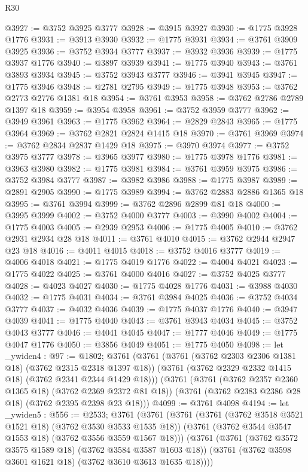 \begin{lexlean}{R30}
\begin{coremodule}
@3927 := @3752 @3925 @3777
@3928 := @3915 @3927
@3930 := @1775 @3928 @1776
@3931 := @3913 @3930
@3932 := @1775 @3931
@3934 := @3761 @3909 @3925
@3936 := @3752 @3934 @3777
@3937 := @3932 @3936
@3939 := @1775 @3937 @1776
@3940 := @3897 @3939
@3941 := @1775 @3940
@3943 := @3761 @3893 @3934
@3945 := @3752 @3943 @3777
@3946 := @3941 @3945
@3947 := @1775 @3946
@3948 := @2781 @2795
@3949 := @1775 @3948
@3953 := @3762 @2773 @2776 @1381 @18
@3954 := @3761 @3953
@3958 := @3762 @2786 @2789 @1397 @18
@3959 := @3954 @3958
@3961 := @3752 @3959 @3777
@3962 := @3949 @3961
@3963 := @1775 @3962
@3964 := @2829 @2843
@3965 := @1775 @3964
@3969 := @3762 @2821 @2824 @1415 @18
@3970 := @3761 @3969
@3974 := @3762 @2834 @2837 @1429 @18
@3975 := @3970 @3974
@3977 := @3752 @3975 @3777
@3978 := @3965 @3977
@3980 := @1775 @3978 @1776
@3981 := @3963 @3980
@3982 := @1775 @3981
@3984 := @3761 @3959 @3975
@3986 := @3752 @3984 @3777
@3987 := @3982 @3986
@3988 := @1775 @3987
@3989 := @2891 @2905
@3990 := @1775 @3989
@3994 := @3762 @2883 @2886 @1365 @18
@3995 := @3761 @3994
@3999 := @3762 @2896 @2899 @81 @18
@4000 := @3995 @3999
@4002 := @3752 @4000 @3777
@4003 := @3990 @4002
@4004 := @1775 @4003
@4005 := @2939 @2953
@4006 := @1775 @4005
@4010 := @3762 @2931 @2934 @28 @18
@4011 := @3761 @4010
@4015 := @3762 @2944 @2947 @23 @18
@4016 := @4011 @4015
@4018 := @3752 @4016 @3777
@4019 := @4006 @4018
@4021 := @1775 @4019 @1776
@4022 := @4004 @4021
@4023 := @1775 @4022
@4025 := @3761 @4000 @4016
@4027 := @3752 @4025 @3777
@4028 := @4023 @4027
@4030 := @1775 @4028 @1776
@4031 := @3988 @4030
@4032 := @1775 @4031
@4034 := @3761 @3984 @4025
@4036 := @3752 @4034 @3777
@4037 := @4032 @4036
@4039 := @1775 @4037 @1776
@4040 := @3947 @4039
@4041 := @1775 @4040
@4043 := @3761 @3943 @4034
@4045 := @3752 @4043 @3777
@4046 := @4041 @4045
@4047 := @1777 @4046
@4049 := @1775 @4047 @1776
@4050 := @3856 @4049
@4051 := @1775 @4050
@4098 := let _ywiden4 : @97 := @1802;
  @3761
    (@3761
      (@3761 (@3762 @2303 @2306 @1381 @18) (@3762 @2315 @2318 @1397 @18))
      (@3761 (@3762 @2329 @2332 @1415 @18) (@3762 @2341 @2344 @1429 @18)))
    (@3761
      (@3761 (@3762 @2357 @2360 @1365 @18) (@3762 @2369 @2372 @81 @18))
      (@3761 (@3762 @2383 @2386 @28 @18) (@3762 @2395 @2398 @23 @18)))
@4099 := @3761 @4098
@4194 := let _ywiden5 : @556 := @2533;
  @3761
    (@3761
      (@3761
        (@3761 (@3762 @3518 @3521 @1521 @18) (@3762 @3530 @3533 @1535 @18))
        (@3761 (@3762 @3544 @3547 @1553 @18) (@3762 @3556 @3559 @1567 @18)))
      (@3761
        (@3761 (@3762 @3572 @3575 @1589 @18) (@3762 @3584 @3587 @1603 @18))
        (@3761 (@3762 @3598 @3601 @1621 @18) (@3762 @3610 @3613 @1635 @18))))

\end{coremodule}
\end{lexlean}
